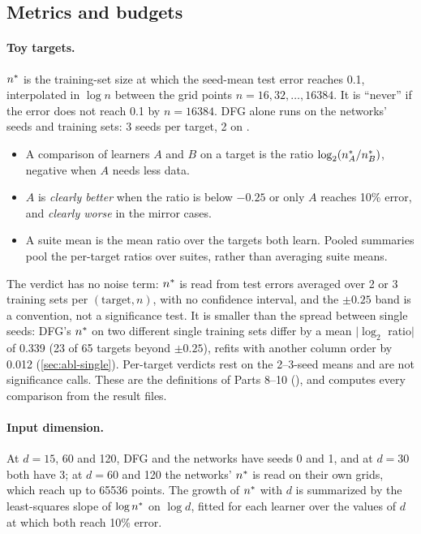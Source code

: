 \subsection{Metrics and budgets}\label{sec:metrics}

\paragraph{Toy targets.} $n^{*}$ is the training-set size at which the seed-mean test error reaches 0.1, interpolated in $\log n$ between the grid points $n=16,32,\dots,16384$. It is ``never'' if the error does not reach 0.1 by $n=16384$. DFG alone runs on the networks' seeds and training sets: 3 seeds per target, 2 on .
\begin{itemize}
\item A comparison of learners $A$ and $B$ on a target is the ratio $\log_2(n^{*}_A/n^{*}_B)$, negative when $A$ needs less data.
\item $A$ is \emph{clearly better} when the ratio is below $-0.25$ or only $A$ reaches 10\% error, and \emph{clearly worse} in the mirror cases.
\item A suite mean is the mean ratio over the targets both learn. Pooled summaries pool the per-target ratios over suites, rather than averaging suite means.
\end{itemize}
The verdict has no noise term: $n^{*}$ is read from test errors averaged over 2 or 3 training sets per $(\text{target},n)$, with no confidence interval, and the $\pm0.25$ band is a convention, not a significance test. It is smaller than the spread between single seeds: DFG's $n^{*}$ on two different single training sets differ by a mean $|\log_2$ ratio$|$ of 0.339 (23 of 65 targets beyond $\pm0.25$), refits with another column order by 0.012 (\cref{sec:abl-single}). Per-target verdicts rest on the 2--3-seed means and are not significance calls. These are the definitions of Parts 8--10 (), and  computes every comparison from the result files.

\paragraph{Input dimension.} At $d=15$, 60 and 120, DFG and the networks have seeds 0 and 1, and at $d=30$ both have 3; at $d=60$ and 120 the networks' $n^{*}$ is read on their own grids, which reach up to 65536 points. The growth of $n^{*}$ with $d$ is summarized by the least-squares slope of $\log n^{*}$ on $\log d$, fitted for each learner over the values of $d$ at which both reach 10\% error.

